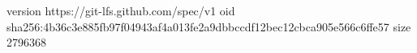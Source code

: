 version https://git-lfs.github.com/spec/v1
oid sha256:4b36c3e885fb97f04943af4a013fe2a9dbbccdf12bec12cbca905e566c6ffe57
size 2796368
